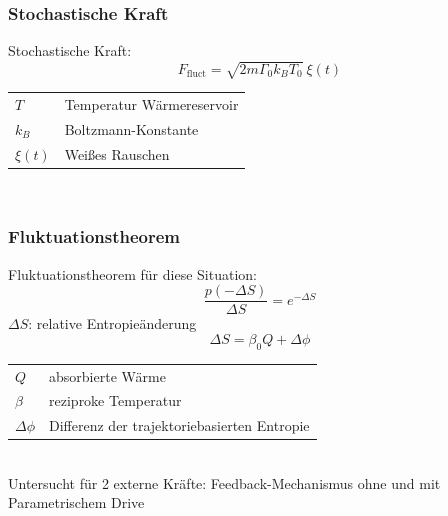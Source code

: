 \documentclass[handout]{beamer}
\begin{document}
\begin{frame}
\frametitle{Stochastische Kraft}
Stochastische Kraft:
\begin{equation}
    \label{eq:ffluct}
    F_\text{fluct} = \sqrt{2m\Gamma_0k_BT_0} \ \xi\left(t\right)
\end{equation}
\begin{tabular}{l l}
$T$ & Temperatur Wärmereservoir\\
$k_B$ & Boltzmann-Konstante\\
$\xi(t)$ & Weißes Rauschen\\
\end{tabular}\\
\end{frame}

\begin{frame}
\frametitle{Fluktuationstheorem}
Fluktuationstheorem für diese Situation:
\begin{equation}
    \label{eq:fluctuationtheorem}
    \frac{p(-\Delta S)}{\Delta S} = e^{-\Delta S}
\end{equation}
$\Delta S$: relative Entropieänderung
\begin{equation}
    \Delta S = \beta_0 Q + \Delta \phi
\end{equation}
\begin{tabular}{l l}
$Q$ & absorbierte Wärme\\
$\beta$ & reziproke Temperatur\\
$\Delta \phi$ & Differenz der trajektoriebasierten Entropie
\end{tabular}\\
Untersucht für 2 externe Kräfte: Feedback-Mechanismus ohne und mit Parametrischem Drive
\end{frame}
\end{document}
